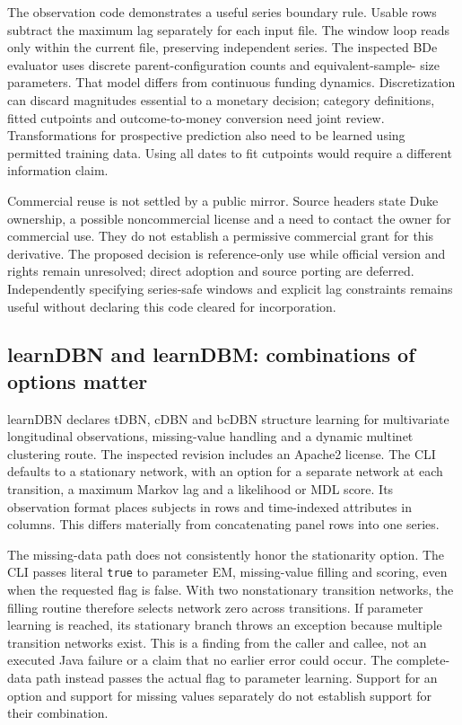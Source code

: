 The observation code demonstrates a useful series boundary rule. Usable rows
subtract the maximum lag separately for each input file. The window loop reads
only within the current file, preserving independent series. The inspected
BDe evaluator uses discrete parent-configuration counts and equivalent-sample-
size parameters. That model differs from continuous funding dynamics.
Discretization can discard magnitudes essential to a monetary decision;
category definitions, fitted cutpoints and outcome-to-money conversion need
joint review. Transformations for prospective prediction also need to be
learned using permitted training data. Using all dates to fit cutpoints would
require a different information claim.~\citep{exec15_javatemporal_banjo}

Commercial reuse is not settled by a public mirror. Source headers state Duke
ownership, a possible noncommercial license and a need to contact the owner
for commercial use. They do not establish a permissive commercial grant for
this derivative. The proposed decision is reference-only use while official
version and rights remain unresolved; direct adoption and source porting are
deferred. Independently specifying series-safe windows and explicit lag
constraints remains useful without declaring this code cleared for
incorporation.~\citep{exec15_javatemporal_banjo,exec15_javatemporal_design}

\subsection{learnDBN and learnDBM: combinations of options matter}

learnDBN declares tDBN, cDBN and bcDBN structure learning for multivariate
longitudinal observations, missing-value handling and a dynamic multinet
clustering route. The inspected revision includes an Apache2 license. The CLI
defaults to a stationary network, with an option for a separate network at
each transition, a maximum Markov lag and a likelihood or MDL score. Its
observation format places subjects in rows and time-indexed attributes in
columns. This differs materially from concatenating panel rows into one
series.~\citep{exec15_javatemporal_learndbn}

The missing-data path does not consistently honor the stationarity option.
The CLI passes literal \texttt{true} to parameter EM, missing-value filling and
scoring, even when the requested flag is false. With two nonstationary
transition networks, the filling routine therefore selects network zero
across transitions. If parameter learning is reached, its stationary branch
throws an exception because multiple transition networks exist. This is a
finding from the caller and callee, not an executed Java failure or a claim
that no earlier error could occur. The complete-data path instead passes the
actual flag to parameter learning. Support for an option and support for
missing values separately do not establish support for their combination.
\citep{exec15_javatemporal_learndbn,exec15_javatemporal_exact}


